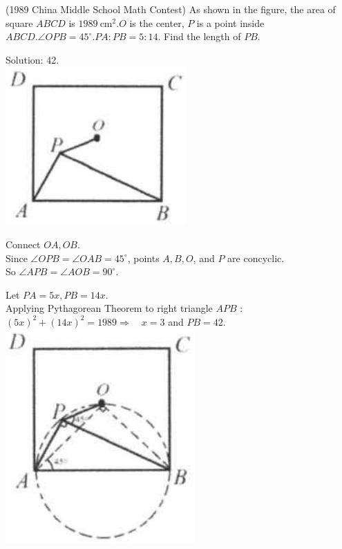 \documentclass{article}
\begin{document}
(1989 China Middle School Math Contest) As shown in the figure, the area of square \(A B C D\) is \(1989 \mathrm{~cm}^{2} . O\) is the center, \(P\) is a point inside \(A B C D . \angle O P B=45^{\circ} . P A: P B=5: 14\). Find the length of \(P B\).

Solution: 42.\\
\centering
\includegraphics[width=\textwidth]{images/204(2).jpg}

Connect \(O A, O B\).\\
Since \(\angle O P B=\angle O A B=45^{\circ}\), points \(A, B, O\), and \(P\) are concyclic.\\
So \(\angle A P B=\angle A O B=90^{\circ}\).


Let \(P A=5 x, P B=14 x\).\\
Applying Pythagorean Theorem to right triangle \(A P B\) :\\
\((5 x)^{2}+(14 x)^{2}=1989 \Rightarrow \quad x=3\) and \(P B=42\).\\
\centering
\includegraphics[width=\textwidth]{images/205.jpg}
\end{document}
